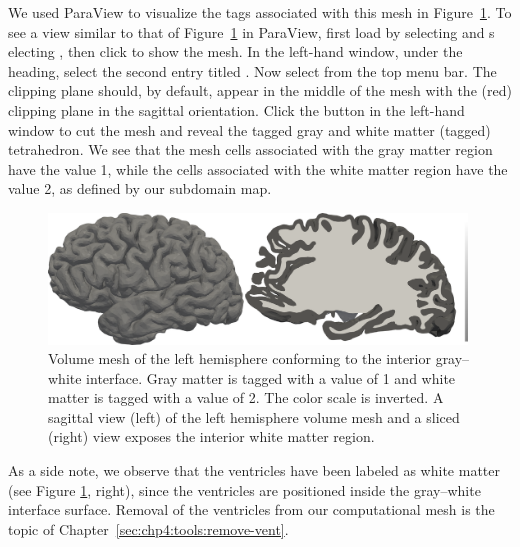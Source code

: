 We used ParaView to visualize the tags associated with this mesh
in Figure~\ref{fig:chp4:ernie-tagged-twodomain-mesh}. To see a view similar 
to that of Figure~\ref{fig:chp4:ernie-tagged-twodomain-mesh} in ParaView, first 
load  by selecting  and s
electing , then click  to show the mesh. In 
the left-hand window, under the  heading, select the second 
entry titled . Now select 
 from the top menu 
bar. The clipping plane should, by default, appear in the middle of the mesh 
with the (red) clipping plane in the sagittal orientation. Click the 
 button in the left-hand window to cut the mesh and reveal the 
tagged gray and white matter (tagged) tetrahedron. We see that the
mesh cells associated with the gray matter region have the value 1,
while the cells associated with the white matter region have the value
2, as defined by our subdomain map.

\begin{figure}
  \includegraphics[width=0.99\textwidth]{./graphics/chp4/two-domain-tagged-bw.png}
  \caption{Volume mesh of the left hemisphere conforming to the
    interior gray--white interface. Gray matter is tagged with a value of 1 
    and white matter is tagged with a value of 2. The color scale is inverted. 
    A sagittal view (left) of the left hemisphere volume mesh and a sliced 
    (right) view exposes the interior white matter region.}
  \label{fig:chp4:ernie-tagged-twodomain-mesh}
\end{figure}

As a side note, we observe that the ventricles have been labeled as
white matter (see Figure \ref{fig:chp4:ernie-tagged-twodomain-mesh},
right), since the ventricles are positioned inside the gray--white
interface surface. Removal of the ventricles from our computational mesh
is the topic of Chapter~\ref{sec:chp4:tools:remove-vent}.

